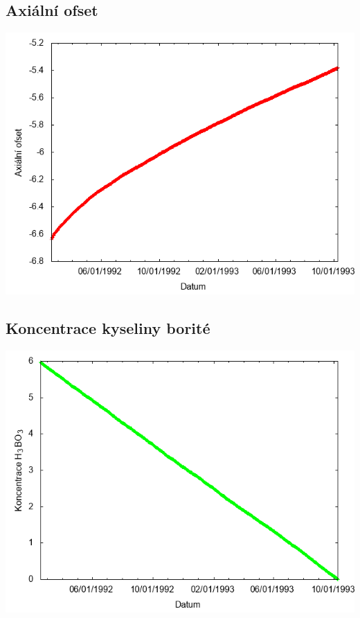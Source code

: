 \documentclass[a4paper,twoside,11pt]{article}
\begin{document}
\subsection*{Axiální ofset}
\begin{center}
\includegraphics[width=.8\textwidth]{graphs/Atlantis_05_ao.png}
\end{center}

\subsection*{Koncentrace kyseliny borité}
\begin{center}
\includegraphics[width=.8\textwidth]{graphs/Atlantis_05_bc.png}
\end{center}
\end{document}
